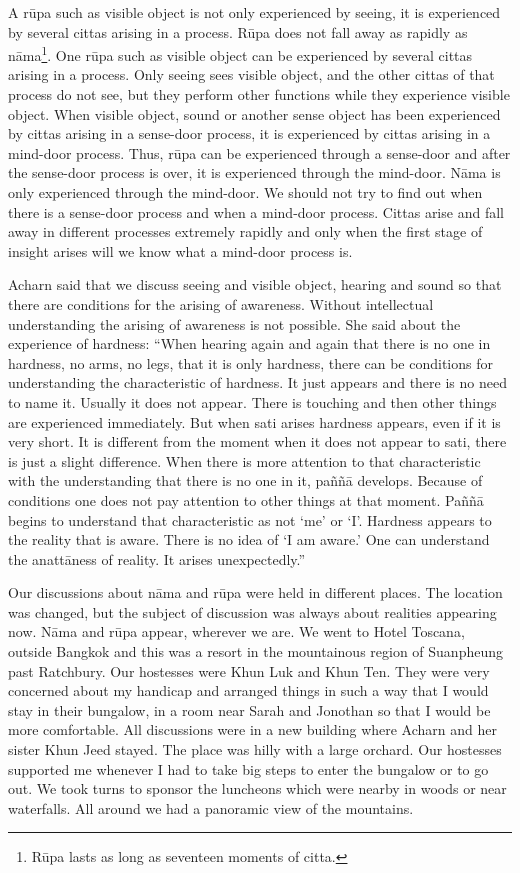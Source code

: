 A rūpa such as visible object is not only experienced by seeing, it is
experienced by several cittas arising in a process. Rūpa does not fall
away as rapidly as nāma\footnote{Rūpa lasts as long as
seventeen moments of citta.}.
One rūpa such as visible object can be experienced by several cittas
arising in a process. Only seeing sees visible object, and the other
cittas of that process do not see, but they perform other functions
while they experience visible object. When visible object, sound or
another sense object has been experienced by cittas arising in a
sense-door process, it is experienced by cittas arising in a mind-door
process. Thus, rūpa can be experienced through a sense-door and after
the sense-door process is over, it is experienced through the mind-door.
Nāma is only experienced through the mind-door. We should not try to
find out when there is a sense-door process and when a mind-door
process. Cittas arise and fall away in different processes extremely
rapidly and only when the first stage of insight arises will we know
what a mind-door process is.

Acharn said that we discuss seeing and visible object, hearing and sound
so that there are conditions for the arising of awareness. Without
intellectual understanding the arising of awareness is not possible. She
said about the experience of hardness: ``When hearing again and again
that there is no one in hardness, no arms, no legs, that it is only
hardness, there can be conditions for understanding the characteristic
of hardness. It just appears and there is no need to name it. Usually it
does not appear. There is touching and then other things are experienced
immediately. But when sati arises hardness appears, even if it is very
short. It is different from the moment when it does not appear to sati,
there is just a slight difference. When there is more attention to that
characteristic with the understanding that there is no one in it, paññā
develops. Because of conditions one does not pay attention to other
things at that moment. Paññā begins to understand that characteristic as
not `me' or `I'. Hardness appears to the reality that is aware. There is
no idea of `I am aware.' One can understand the anattāness of reality.
It arises unexpectedly.''

Our discussions about nāma and rūpa were held in different places. The
location was changed, but the subject of discussion was always about
realities appearing now. Nāma and rūpa appear, wherever we are. We went
to Hotel Toscana, outside Bangkok and this was a resort in the
mountainous region of Suanpheung past Ratchbury. Our hostesses were Khun
Luk and Khun Ten. They were very concerned about my handicap and
arranged things in such a way that I would stay in their bungalow, in a
room near Sarah and Jonothan so that I would be more comfortable. All
discussions were in a new building where Acharn and her sister Khun Jeed
stayed. The place was hilly with a large orchard. Our hostesses
supported me whenever I had to take big steps to enter the bungalow or
to go out. We took turns to sponsor the luncheons which were nearby in
woods or near waterfalls. All around we had a panoramic view of the
mountains.

